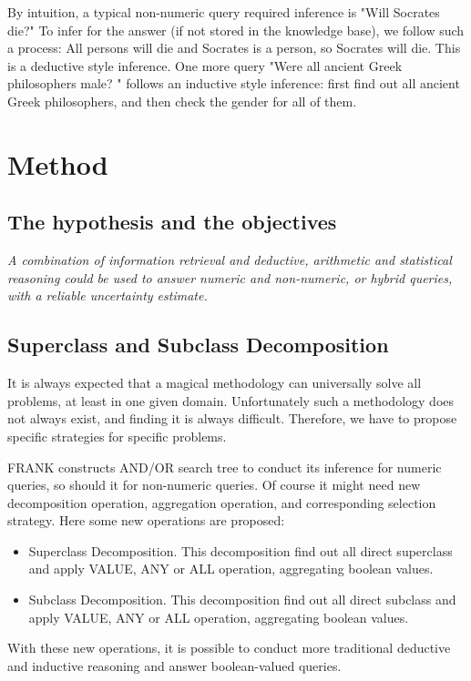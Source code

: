 \documentclass[12pt]{extarticle}
\begin{document}
By intuition, a typical non-numeric query required inference is "Will Socrates die?" To infer for the answer (if not stored in the knowledge base), we follow such a process: All persons will die and Socrates is a person, so Socrates will die. This is a deductive style inference. One more query "Were all ancient Greek philosophers male? " follows an inductive style inference: first find out all ancient Greek philosophers, and then check the gender for all of them.


\section{Method}
\subsection{The hypothesis and the objectives}
\textit{A combination of information retrieval and deductive, arithmetic and statistical reasoning could be used to answer numeric and non-numeric, or hybrid queries, with a reliable uncertainty estimate.}

\subsection{Superclass and Subclass Decomposition}
It is always expected that a magical methodology can universally solve all problems, at least in one given domain. Unfortunately such a methodology does not always exist, and finding it is always difficult. Therefore, we have to propose specific strategies for specific problems.

FRANK constructs AND/OR search tree to conduct its inference for numeric queries, so should it for non-numeric queries. Of course it might need new decomposition operation, aggregation operation, and corresponding selection strategy. Here  some new operations are proposed:

\begin{itemize}
\item Superclass Decomposition. This decomposition find out all direct superclass and apply VALUE, ANY or ALL operation, aggregating boolean values.
\item Subclass Decomposition. This decomposition find out all direct subclass and apply VALUE, ANY or ALL operation, aggregating boolean values.
\end{itemize}

With these new operations, it is possible to conduct more traditional deductive and inductive reasoning and answer boolean-valued queries. 
\end{document}
